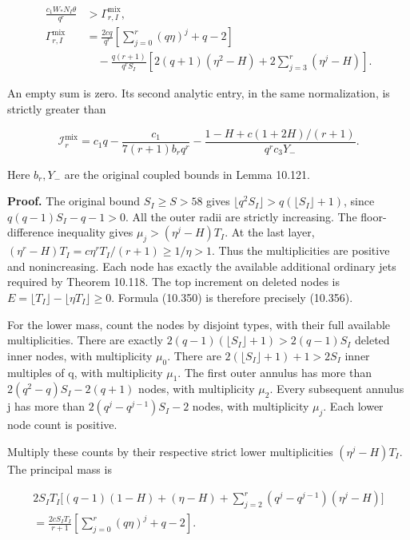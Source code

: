 \documentclass[
  11pt,
  a4paper,
]{article}
\begin{document}
\[
\begin{aligned}
\frac{c_1W_*N_I\theta}{q^r}
&>\Gamma_{r,I}^{\mathrm{mix}},\\
\Gamma_{r,I}^{\mathrm{mix}}
&=\frac{2cq}{q^r}
\left[\sum_{j=0}^r(q\eta)^j+q-2\right]\\
&\quad-\frac{q(r+1)}{q^rS_I}
\left[2(q+1)(\eta^2-H)+2\sum_{j=3}^r(\eta^j-H)\right].
\end{aligned}
\tag{10.357}
\]

An empty sum is zero. Its second analytic entry, in the same
normalization, is strictly greater than

\[
\mathcal I_r^{\mathrm{mix}}
=c_1q-\frac{c_1}{7(r+1)b_rq^r}
-\frac{1-H+c(1+2H)/(r+1)}{q^rc_3Y_-}.
\tag{10.358}
\]

Here \(b_r,Y_-\) are the original coupled bounds in Lemma 10.121.

\textbf{Proof.} The original bound \(S_I\ge S>58\) gives
\(\lfloor q^2S_I\rfloor>q(\lfloor S_I\rfloor+1)\), since
\(q(q-1)S_I-q-1>0\). All the outer radii are strictly increasing. The
floor-difference inequality gives \(\mu_j>(\eta^j-H)T_I\). At the last
layer, \((\eta^r-H)T_I=c\eta^rT_I/(r+1)\ge1/\eta>1\). Thus the
multiplicities are positive and nonincreasing. Each node has exactly the
available additional ordinary jets required by Theorem 10.118. The top
increment on deleted nodes is
\(E=\lfloor T_I\rfloor-\lfloor\eta T_I\rfloor\ge0\). Formula (10.350) is
therefore precisely (10.356).

For the lower mass, count the nodes by disjoint types, with their full
available multiplicities. There are exactly
\(2(q-1)(\lfloor S_I\rfloor+1)>2(q-1)S_I\) deleted inner nodes, with
multiplicity \(\mu_0\). There are \(2(\lfloor S_I\rfloor+1)+1>2S_I\)
inner multiples of q, with multiplicity \(\mu_1\). The first outer
annulus has more than \(2(q^2-q)S_I-2(q+1)\) nodes, with multiplicity
\(\mu_2\). Every subsequent annulus j has more than
\(2(q^j-q^{j-1})S_I-2\) nodes, with multiplicity \(\mu_j\). Each lower
node count is positive.

Multiply these counts by their respective strict lower multiplicities
\((\eta^j-H)T_I\). The principal mass is

\[
\begin{aligned}
2S_IT_I\bigg[(q-1)(1-H)+(\eta-H)
+\sum_{j=2}^r(q^j-q^{j-1})(\eta^j-H)\bigg]\\
=\frac{2cS_IT_I}{r+1}
\left[\sum_{j=0}^r(q\eta)^j+q-2\right].
\end{aligned}
\tag{10.359}
\]
\end{document}

